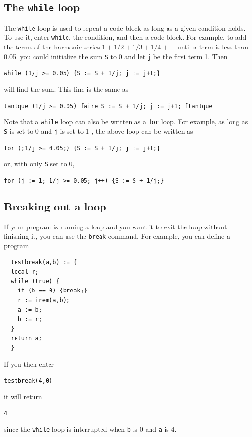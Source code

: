 \documentclass[a4paper,11pt]{book}
\begin{document}
\subsection{The \texttt{while} loop}

The \texttt{while} loop is used to repeat a code block as long as a
given condition holds.  To use it, enter \texttt{while}, the
condition, and then a code block.  For example, to add the terms of
the harmonic series $1 + 1/2 + 1/3 + 1/4 + \dots$ until a term is less
than 0.05, you could initialize the sum \texttt{S} to 0 and let
\texttt{j} be the first term 1.  Then
\begin{center}
{\tt  while (1/j >= 0.05) \{S := S + 1/j; j := j+1;\}}
\end{center}
will find the sum.  This line is the same as
\begin{center}
{\tt  tantque (1/j >= 0.05) faire S := S + 1/j; j := j+1; ftantque}
\end{center}

Note that a \texttt{while} loop can also be written as a \texttt{for}
loop.  For example, as long as \texttt{S} is set to 0 and \texttt{j}
is set to 1 , the above loop
can be written as 
\begin{center}
{\tt  for (;1/j >= 0.05;) \{S := S + 1/j; j := j+1;\}}
\end{center}
or, with only \texttt{S} set to 0,
\begin{center}
{\tt  for (j := 1; 1/j >= 0.05; j++) \{S := S + 1/j;\}}
\end{center}

\subsection{Breaking out a loop}

If your program is running a loop and you want it to exit the loop
without finishing it, you can use the \texttt{break}
command.   For example, you can define a program
\begin{verbatim}
  testbreak(a,b) := {
  local r;
  while (true) {
    if (b == 0) {break;}
    r := irem(a,b);
    a := b;
    b := r;
  }
  return a;
  }
\end{verbatim}
If you then enter
\begin{center}
  {\tt testbreak(4,0)}
\end{center}
it will return
\begin{center}
  {\tt 4}
\end{center}
since the \texttt{while} loop is interrupted when \texttt{b} is 0 and
\texttt{a} is 4.
\end{document}
